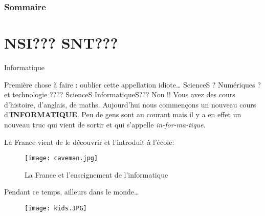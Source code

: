 \documentclass[french]{beamer}
\begin{document}
\begin{frame}
 \frametitle{Sommaire}
{\scriptsize
\begin{multicols}{2} 
 \tableofcontents
\end{multicols}
}

 
 \end{frame}

\normalsize





























\section{NSI??? SNT???}

\begin{frame}[fragile]{Informatique}
\protect\hypertarget{informatique}{}


Première chose à faire : oublier cette appellation idiote\ldots{}
\pause ScienceS ? \pause Numériques ? \pause et technologie ????
\pause ScienceS InformatiqueS???
Non !! Vous avez des cours d'histoire, d'anglais, de maths. Aujourd'hui
nous commençons un nouveau cours d'\textbf{INFORMATIQUE}.
\pause
Peu de gens sont au courant mais il y a en effet un nouveau truc qui
vient de sortir et qui s'appelle \pause \emph{in-for-ma-tique}.


\end{frame}

\begin{frame}
   La France vient
de le découvrir et l'introduit à l'école:\pause
\begin{figure}
\centering
\texttt{[image: caveman.jpg]}
\caption{La France et l'enseignement de l'informatique}
\end{figure}
\end{frame}



\begin{frame}
Pendant ce temps, ailleurs dans le monde\ldots{}
\pause
\begin{figure}
\centering
\texttt{[image: kids.JPG]}
\end{figure}

\end{frame}
\end{document}
